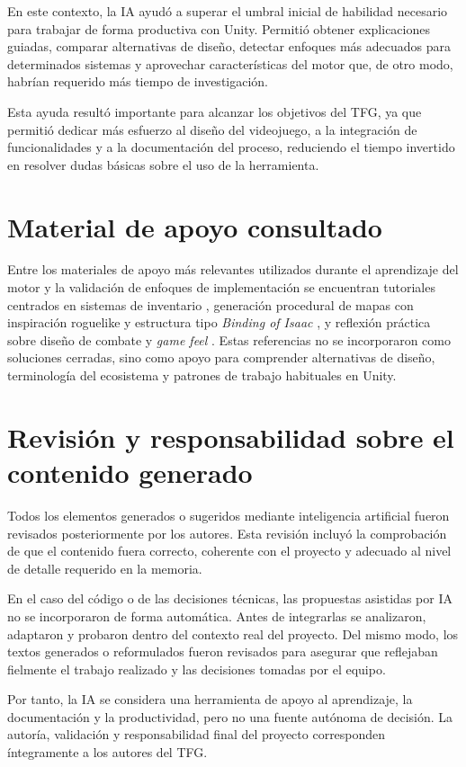 En este contexto, la IA ayudó a superar el umbral inicial de habilidad necesario para
trabajar de forma productiva con Unity. Permitió obtener explicaciones guiadas, comparar
alternativas de diseño, detectar enfoques más adecuados para determinados sistemas y
aprovechar características del motor que, de otro modo, habrían requerido más tiempo de
investigación.

Esta ayuda resultó importante para alcanzar los objetivos del TFG, ya que permitió dedicar
más esfuerzo al diseño del videojuego, a la integración de funcionalidades y a la
documentación del proceso, reduciendo el tiempo invertido en resolver dudas básicas sobre
el uso de la herramienta.

\section{Material de apoyo consultado}
Entre los materiales de apoyo más relevantes utilizados durante el aprendizaje del motor y
la validación de enfoques de implementación se encuentran tutoriales centrados en sistemas
de inventario \cite{rumpledcodeInventory}, generación procedural de mapas con inspiración
roguelike y estructura tipo \textit{Binding of Isaac} \cite{garnetBindingMap,luiscanaryProcgen},
y reflexión práctica sobre diseño de combate y \textit{game feel} \cite{gameendeavorCombatFun}.
Estas referencias no se incorporaron como soluciones cerradas, sino como apoyo para
comprender alternativas de diseño, terminología del ecosistema y patrones de trabajo
habituales en Unity.

\section{Revisión y responsabilidad sobre el contenido generado}
Todos los elementos generados o sugeridos mediante inteligencia artificial fueron revisados
posteriormente por los autores. Esta revisión incluyó la comprobación de que el contenido
fuera correcto, coherente con el proyecto y adecuado al nivel de detalle requerido en la
memoria.

En el caso del código o de las decisiones técnicas, las propuestas asistidas por IA no se
incorporaron de forma automática. Antes de integrarlas se analizaron, adaptaron y probaron
dentro del contexto real del proyecto. Del mismo modo, los textos generados o reformulados
fueron revisados para asegurar que reflejaban fielmente el trabajo realizado y las
decisiones tomadas por el equipo.

Por tanto, la IA se considera una herramienta de apoyo al aprendizaje, la documentación y
la productividad, pero no una fuente autónoma de decisión. La autoría, validación y
responsabilidad final del proyecto corresponden íntegramente a los autores del TFG.
